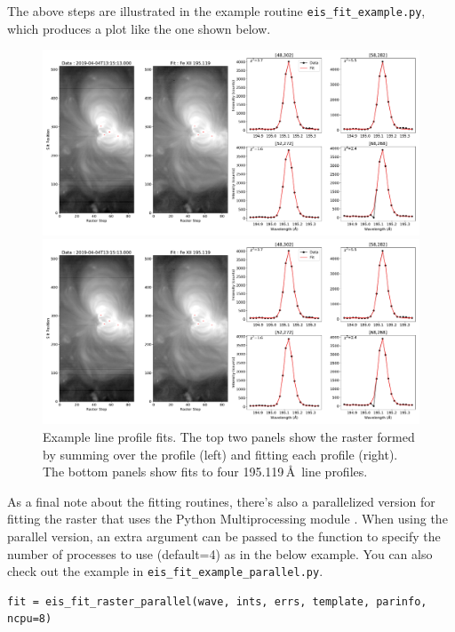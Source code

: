The above steps are illustrated in the example routine \verb+eis_fit_example.py+, which produces a plot like the one shown below.

\begin{figure}[t]
  \centerline{\includegraphics[clip,width=0.8\linewidth,bb=0 0 750 737]{figures/fit_example.pdf}}
  \centerline{\includegraphics[clip,width=0.8\linewidth,bb=750 0 1500 737]{figures/fit_example.pdf}}  
  \caption{Example line profile fits. The top two panels show the raster formed by summing over the
    profile (left) and fitting each profile (right). The bottom panels show fits to four
     195.119\,\AA\ line profiles.}
  \label{fig:fit_example}
\end{figure}

As a final note about the fitting routines, there's also a parallelized version for fitting the raster that uses the Python Multiprocessing module . When using the parallel version, an extra argument can be passed to the function to specify the number of processes to use (default=4) as in the below example. You can also check out the example in \verb+eis_fit_example_parallel.py+.

\begin{lstlisting}
fit = eis_fit_raster_parallel(wave, ints, errs, template, parinfo, ncpu=8)
\end{lstlisting}
